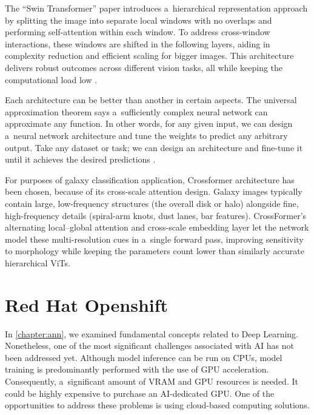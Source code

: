 The \enquote{Swin Transformer} paper introduces a~hierarchical representation approach by splitting the image into separate local windows with no overlaps and performing self-attention within each window. To address cross-window interactions, these windows are shifted in the following layers, aiding in complexity reduction and efficient scaling for bigger images. This architecture delivers robust outcomes across different vision tasks, all while keeping the computational load low \cite{liu2021swintransformerhierarchicalvision}.

\medskip

Each architecture can be better than another in certain aspects. The universal approximation theorem says a~sufficiently complex neural network can approximate any function. In other words, for any given input, we can design a~neural network architecture and tune the weights to predict any arbitrary output. Take any dataset or task; we can design an architecture and fine-tune it until it achieves the desired predictions \cite{ayyadevara2024modern}.

\medskip

For purposes of galaxy classification application, Crossformer architecture has been chosen, because of its cross-scale attention design. Galaxy images typically contain large, low-frequency structures (the overall disk or halo) alongside fine, high-frequency details (spiral-arm knots, dust lanes, bar features). CrossFormer’s alternating local–global attention and cross-scale embedding layer let the network model these multi-resolution cues in a~single forward pass, improving sensitivity to morphology while keeping the parameters count lower than similarly accurate hierarchical ViTs.

\chapter{Red Hat Openshift}

In \autoref{chapter:ann}, we examined fundamental concepts related to Deep Learning. Nonetheless, one of the most significant challenges associated with AI has not been addressed yet. Although model inference can be run on CPUs, model training is predominantly performed with the use of GPU acceleration. Consequently, a~significant amount of VRAM and GPU resources is needed. It could be highly expensive to purchase an AI-dedicated GPU. One of the opportunities to address these problems is using cloud-based computing solutions.

